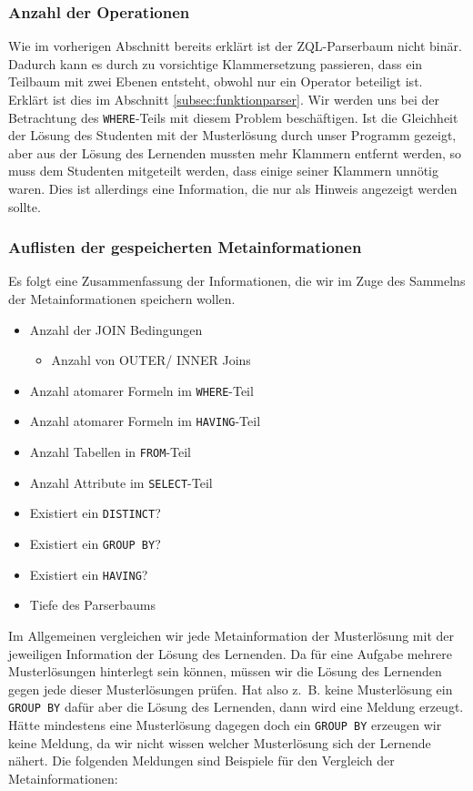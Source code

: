 \subsubsection*{Anzahl der Operationen}

Wie im vorherigen Abschnitt bereits erklärt ist der ZQL-Parserbaum nicht binär. Dadurch kann es durch zu vorsichtige Klammersetzung passieren, dass ein Teilbaum mit zwei Ebenen entsteht, obwohl nur ein Operator beteiligt ist. Erklärt ist dies im Abschnitt \ref{subsec:funktionparser}. Wir werden uns bei der Betrachtung des \verb|WHERE|-Teils mit diesem Problem beschäftigen. Ist die Gleichheit der Lösung des Studenten mit der Musterlösung durch unser Programm gezeigt, aber aus der Lösung des Lernenden mussten mehr Klammern entfernt werden, so muss dem Studenten mitgeteilt werden, dass einige seiner Klammern unnötig waren. Dies ist allerdings eine Information, die nur als Hinweis angezeigt werden sollte.

\subsubsection*{Auflisten der gespeicherten Metainformationen}

Es folgt eine Zusammenfassung der Informationen, die wir im Zuge des Sammelns der Metainformationen speichern wollen.

\begin{itemize}
\item Anzahl der JOIN Bedingungen
	\begin{itemize}
	\item Anzahl von OUTER/ INNER Joins
	\end{itemize}
\item Anzahl atomarer Formeln im \verb|WHERE|-Teil
\item Anzahl atomarer Formeln im \verb|HAVING|-Teil
\item Anzahl Tabellen in \verb|FROM|-Teil
\item Anzahl Attribute im \verb|SELECT|-Teil 
\item Existiert ein \verb|DISTINCT|?
\item Existiert ein \verb|GROUP BY|?  
\item Existiert ein \verb|HAVING|?
\item Tiefe des Parserbaums 
\end{itemize}

Im Allgemeinen vergleichen wir jede Metainformation der Musterlösung mit der jeweiligen Information der Lösung des Lernenden. Da für eine Aufgabe mehrere Musterlösungen hinterlegt sein können, müssen wir die Lösung des Lernenden gegen jede dieser Musterlösungen prüfen. Hat also \mbox{z. B.} keine Musterlösung ein \verb|GROUP BY| dafür aber die Lösung des Lernenden, dann wird eine Meldung erzeugt. Hätte mindestens eine Musterlösung dagegen doch ein \verb|GROUP BY| erzeugen wir keine Meldung, da wir nicht wissen welcher Musterlösung sich der Lernende nähert. Die folgenden Meldungen sind Beispiele für den Vergleich der Metainformationen:

